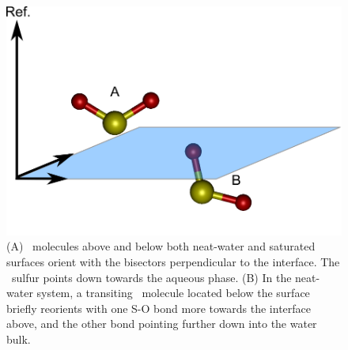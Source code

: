 \begin{figure}[h!]
	\begin{center}
		\includegraphics[scale=1.0]{images/angle-cartoons/so2-surface.png}
		\caption{(A) \suldiox~molecules above and below both neat-water and saturated surfaces orient with the bisectors perpendicular to the interface. The \suldiox~sulfur points down towards the aqueous phase. (B) In the neat-water system, a transiting \suldiox~molecule located below the surface briefly reorients with one S-O bond more towards the interface above, and the other bond pointing further down into the water bulk.}
		\label{fig:so2-surface-angles}
	\end{center}
\end{figure}

